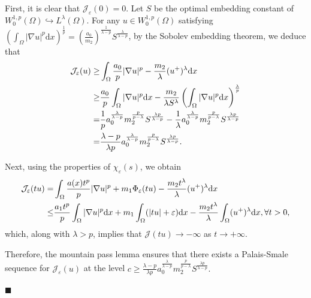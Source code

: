 \documentclass[onecolumn]{autart}
\newenvironment{proof}{{\it Proof: \enspace}}{\hfill $\blacksquare$\par}
\begin{document}
\begin{proof}
	First, it is clear that $\mathcal{J}_\varepsilon(0) = 0$. {Let  $S$ be  the optimal embedding constant of $W^{1,p}_0(\Omega)\hookrightarrow L^{\lambda}(\Omega)$.} For any $u\in W_0^{1,p}(\Omega)$ satisfying $\left( \int_{\Omega} |\nabla u|^p  \mathrm{d}x \right)^{\frac{1}{p}} = \left( \frac{a_0}{m_2} \right)^{\frac{1}{\lambda - p}} S^{\frac{\lambda}{\lambda - p}}$, by the Sobolev embedding theorem, we deduce that
	\begin{align}
		\mathcal{J}_{\varepsilon}(u) \geq& \int_{\Omega} \frac{a_0}{p}|\nabla u|^p -\frac{m_2}{\lambda}(u^+)^{\lambda}  \mathrm{d}x
		\notag\\ \geq
		&\frac{a_0}{p}\int_{\Omega} |\nabla u|^p \mathrm{d}x -\frac{m_2}{\lambda S^\lambda} \left( \int_{\Omega} |\nabla u|^p \mathrm{d}x\right)^\frac{\lambda}{p}
		\notag\\ =
		&\frac{1}{p}a_0^{\frac{\lambda}{\lambda-p}}m_2^{\frac{p}{p-\lambda}}S^{\frac{\lambda p}{\lambda-p}} - \frac{1}{\lambda}a_0^{\frac{\lambda}{\lambda-p}}m_2^{\frac{p}{p-\lambda}}S^{\frac{\lambda p}{\lambda-p}}
		\notag\\ =
		& \frac{\lambda-p}{\lambda p}a_0^{\frac{\lambda}{\lambda-p}}m_2^{\frac{p}{p-\lambda}}S^{\frac{\lambda p}{\lambda-p}}.\notag
	\end{align} 	
	
	Next, using the properties of $\chi_\varepsilon(s)$, we obtain
	\begin{align}
		\mathcal{J}_{\varepsilon}(tu) = &\int_{\Omega} \frac{a(x)t^p}{p}|\nabla u|^p + m_1 \Phi_{\varepsilon}(tu) -\frac{m_2t^\lambda}{\lambda}(u^+)^{\lambda}  \mathrm{d}x
		\notag\\ \leq
		&\frac{a_1t^p}{p}\int_{\Omega} |\nabla u|^p \mathrm{d}x + m_1\int_{\Omega}( |tu|+\varepsilon)\mathrm{d}x -\frac{m_2t^\lambda}{\lambda}\int_{\Omega}(u^+)^{\lambda}  \mathrm{d}x, \forall t>0, \label{1.6}
	\end{align}
	which, along with  $   \lambda  >p$,     implies that $\mathcal{J}(t u) \to -\infty$ as $t \to +\infty$.
	
	Therefore, the mountain pass lemma ensures that there exists a Palais-Smale  sequence for $	\mathcal{J}_{\varepsilon}(u)$ at the level {$c \geq  \frac{\lambda-p}{\lambda p}a_0^{\frac{\lambda}{\lambda-p}}m_2^{\frac{p}{p-\lambda}}S^{\frac{\lambda p}{\lambda-p}}  $.}
	

\end{proof}
\end{document}
